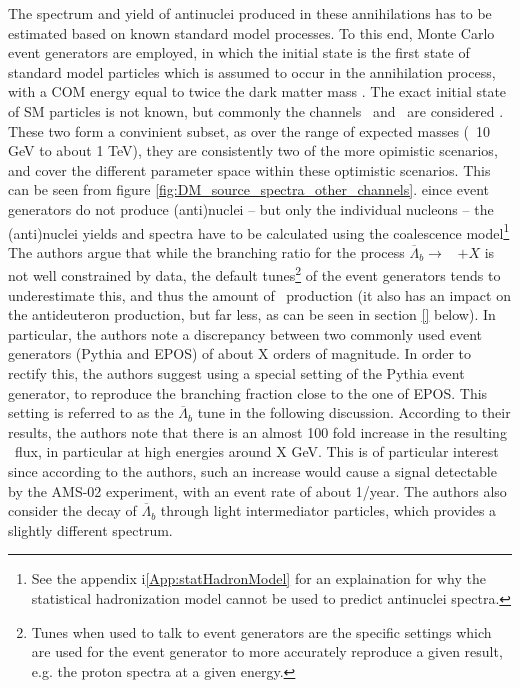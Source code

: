 The spectrum and yield of antinuclei produced in these annihilations has to be estimated based on known standard model processes. To this end, Monte Carlo event generators are employed\cite{}, in which the initial state is the first state of standard model particles which is assumed to occur in the annihilation process, with a COM energy equal to twice the dark matter mass \dmm \cite{}.%
The exact initial state of SM particles is not known, but commonly the channels \WW\ and \bb\ are considered \cite{}. These two form a convinient subset, as over the range of expected masses (~10 GeV to about 1 TeV), they are consistently two of the more opimistic scenarios, and cover the different parameter space within these optimistic scenarios\cite{}. This can be seen from figure \ref{fig:DM_source_spectra_other_channels}. 
eince event generators do not produce (anti)nuclei -- but only the individual nucleons -- the (anti)nuclei yields and spectra have to be calculated using the coalescence model\footnote{See the appendix i\ref{App:statHadronModel} for an explaination for why the statistical hadronization model cannot be used to predict antinuclei spectra.}
The authors argue that while the branching ratio for the process $\overline{\Lambda}_b \rightarrow $ \ahe\ $+X$ is not well constrained by data, the default tunes\footnote{Tunes when used to talk to event generators are the specific settings which are used for the event generator to more accurately reproduce a given result, e.g. the proton spectra at a given energy.} of the event generators tends to underestimate this, and thus the amount of \ahe\ production (it also has an impact on the antideuteron production, but far less, as can be seen in section \ref{} below). In particular, the authors note a discrepancy between two commonly used event generators (Pythia\cite{} and EPOS\cite{}) of about X orders of magnitude. In order to rectify this, the authors suggest using a special setting of the Pythia event generator, to reproduce the branching fraction close to the one of EPOS. This setting is referred to as the $\overline{\Lambda}_b$ tune in the following discussion. According to their results, the authors note that there is an almost 100 fold increase in the resulting \ahe\ flux, in particular at high energies around X GeV. This is of particular interest since according to the authors, such an increase would cause a signal detectable by the AMS-02 experiment, with an event rate of about 1/year.  The authors also consider the decay of $\overline{\Lambda}_b$ through light intermediator particles, which provides a slightly different spectrum.\\

